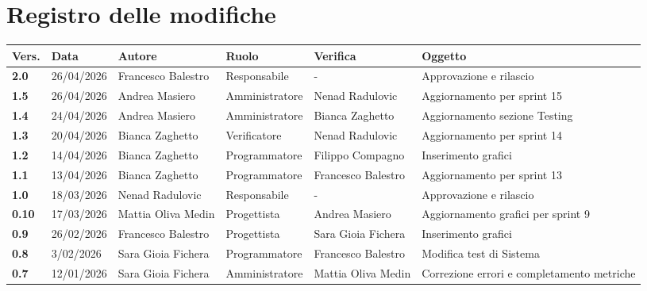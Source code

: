 \documentclass[a4paper,12pt]{article}
\begin{document}
    

    \newpage
    \section*{Registro delle modifiche}
    \begin{xltabular}{\textwidth}{|l|l|X|l|X|X|}
    \hline
    \textbf{Vers.} & \textbf{Data} & \textbf{Autore} & \textbf{Ruolo} & \textbf{Verifica} & \textbf{Oggetto} \\
    \hline
    \endhead
    \endfoot
    \hline
    \endlastfoot
                \textbf{2.0} & 26/04/2026 & Francesco Balestro & Responsabile & - & Approvazione e rilascio\\
                \hline
                \textbf{1.5} & 26/04/2026 & Andrea Masiero & Amministratore & Nenad Radulovic & Aggiornamento per sprint 15\\
                \hline
                \textbf{1.4} & 24/04/2026 & Andrea Masiero & Amministratore & Bianca Zaghetto & Aggiornamento sezione Testing\\
                \hline
                \textbf{1.3} & 20/04/2026 & Bianca Zaghetto & Verificatore & Nenad Radulovic & Aggiornamento per sprint 14\\
                \hline
                \textbf{1.2} & 14/04/2026 & Bianca Zaghetto & Programmatore & Filippo Compagno & Inserimento grafici\\
                \hline
                \textbf{1.1} & 13/04/2026 & Bianca Zaghetto & Programmatore & Francesco Balestro & Aggiornamento per sprint 13\\
                \hline
                \textbf{1.0} & 18/03/2026 & Nenad Radulovic & Responsabile & - & Approvazione e rilascio\\
                \hline
                \textbf{0.10} & 17/03/2026 & Mattia Oliva Medin & Progettista & Andrea Masiero & Aggiornamento grafici per sprint 9\\
                \hline
                \textbf{0.9} & 26/02/2026 & Francesco Balestro & Progettista & Sara Gioia Fichera & Inserimento grafici\\
                \hline
                \textbf{0.8} & 3/02/2026 & Sara Gioia Fichera & Programmatore & Francesco Balestro & Modifica test di Sistema\\
                \hline
                \textbf{0.7} & 12/01/2026 & Sara Gioia Fichera & Amministratore & Mattia Oliva Medin & Correzione errori e completamento metriche \\

\end{xltabular}
\end{document}
